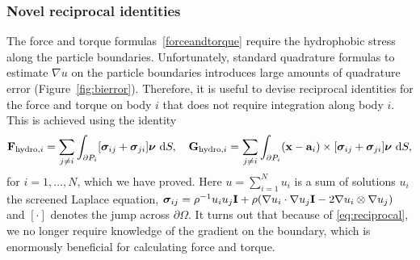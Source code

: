 \subsubsection{Novel reciprocal identities}
The force and torque formulas~\eqref{forceandtorque} require the
hydrophobic stress along the particle boundaries. Unfortunately,
standard quadrature formulas to estimate $\nabla u$ on the particle
boundaries introduces large amounts of quadrature error
(Figure~\ref{fig:bierror}). Therefore, it is useful to devise reciprocal
identities for the force and torque on body $i$ that does not
require integration along body $i$. This is achieved using the identity 
\begin{align}
    \label{eq:reciprocal}
{\bf F}_{\text{hydro},i} = \sum_{j \neq i} \int_{\partial P_i}[\boldsymbol{\sigma}_{ij} + \boldsymbol{\sigma}_{ji}]\boldsymbol{\nu}\,\dif S,\quad
{\bf G}_{\text{hydro},i} = \sum_{j \neq i} \int_{\partial P_i} ({\bf
  x}-\mathbf{a}_i) \times [\boldsymbol{\sigma}_{ij} +
  \boldsymbol{\sigma}_{ji}]\boldsymbol{\nu}\,\dif S, 
\end{align}
for $i=1,\ldots,N$, which we have proved. Here $u = \sum_{i=1}^N u_i$ is
a sum of solutions $u_i$ the screened Laplace equation,
$\boldsymbol{\sigma}_{ij} = \rho^{-1} u_iu_j {\bf I} + \rho(\nabla u_i
\cdot \nabla u_j {\bf I} - 2 \nabla u_i \otimes \nabla u_j)$ and
$[\cdot]$ denotes the jump across $\partial \Omega.$  It turns out that
because of \eqref{eq:reciprocal}, we no longer require knowledge of the
gradient on the boundary, which is enormously beneficial for calculating
force and torque.




